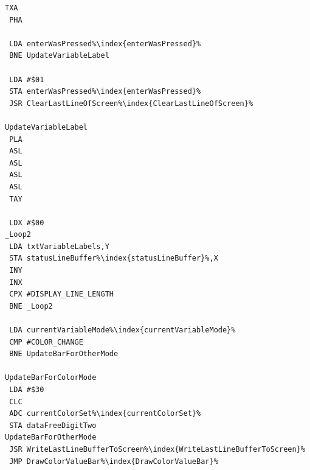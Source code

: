 \begin{minipage}[b]{0.33\linewidth}
\begin{lrbox}{\mybox}
\begin{lstlisting}[basicstyle=\ttfamily\tiny,escapechar=\%]
 TXA
 PHA

 LDA enterWasPressed%\index{enterWasPressed}%
 BNE UpdateVariableLabel

 LDA #$01
 STA enterWasPressed%\index{enterWasPressed}%
 JSR ClearLastLineOfScreen%\index{ClearLastLineOfScreen}%

UpdateVariableLabel
 PLA
 ASL
 ASL
 ASL
 ASL
 TAY

 LDX #$00
_Loop2  
 LDA txtVariableLabels,Y
 STA statusLineBuffer%\index{statusLineBuffer}%,X
 INY
 INX
 CPX #DISPLAY_LINE_LENGTH
 BNE _Loop2

 LDA currentVariableMode%\index{currentVariableMode}%
 CMP #COLOR_CHANGE
 BNE UpdateBarForOtherMode

UpdateBarForColorMode
 LDA #$30
 CLC
 ADC currentColorSet%\index{currentColorSet}%
 STA dataFreeDigitTwo
UpdateBarForOtherMode
 JSR WriteLastLineBufferToScreen%\index{WriteLastLineBufferToScreen}%
 JMP DrawColorValueBar%\index{DrawColorValueBar}%

\end{lstlisting}
\end{lrbox}%
\scalebox{0.8}{\usebox{\mybox}}
\end{minipage}
\hspace{-0.1cm}
